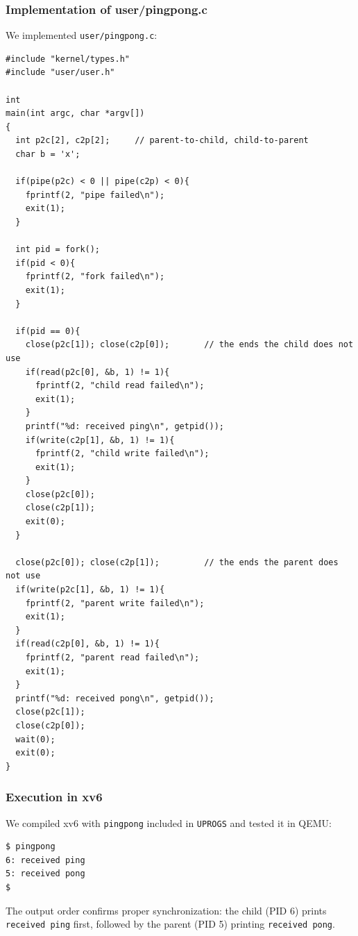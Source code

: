 \documentclass{labreport}
\begin{document}
\subsubsection{Implementation of user/pingpong.c}
We implemented \texttt{user/pingpong.c}:

\begin{lstlisting}[style=c]
#include "kernel/types.h"
#include "user/user.h"

int
main(int argc, char *argv[])
{
  int p2c[2], c2p[2];     // parent-to-child, child-to-parent
  char b = 'x';

  if(pipe(p2c) < 0 || pipe(c2p) < 0){
    fprintf(2, "pipe failed\n");
    exit(1);
  }

  int pid = fork();
  if(pid < 0){
    fprintf(2, "fork failed\n");
    exit(1);
  }

  if(pid == 0){
    close(p2c[1]); close(c2p[0]);       // the ends the child does not use
    if(read(p2c[0], &b, 1) != 1){
      fprintf(2, "child read failed\n");
      exit(1);
    }
    printf("%d: received ping\n", getpid());
    if(write(c2p[1], &b, 1) != 1){
      fprintf(2, "child write failed\n");
      exit(1);
    }
    close(p2c[0]);
    close(c2p[1]);
    exit(0);
  }

  close(p2c[0]); close(c2p[1]);         // the ends the parent does not use
  if(write(p2c[1], &b, 1) != 1){
    fprintf(2, "parent write failed\n");
    exit(1);
  }
  if(read(c2p[0], &b, 1) != 1){
    fprintf(2, "parent read failed\n");
    exit(1);
  }
  printf("%d: received pong\n", getpid());
  close(p2c[1]);
  close(c2p[0]);
  wait(0);
  exit(0);
}
\end{lstlisting}

\subsubsection{Execution in xv6}
We compiled xv6 with \texttt{pingpong} included in \texttt{UPROGS} and tested it in QEMU:

\begin{lstlisting}[style=bash]
$ pingpong
6: received ping
5: received pong
$
\end{lstlisting}
The output order confirms proper synchronization: the child (PID 6) prints \texttt{received ping} first, followed by the parent (PID 5) printing \texttt{received pong}.
\end{document}
